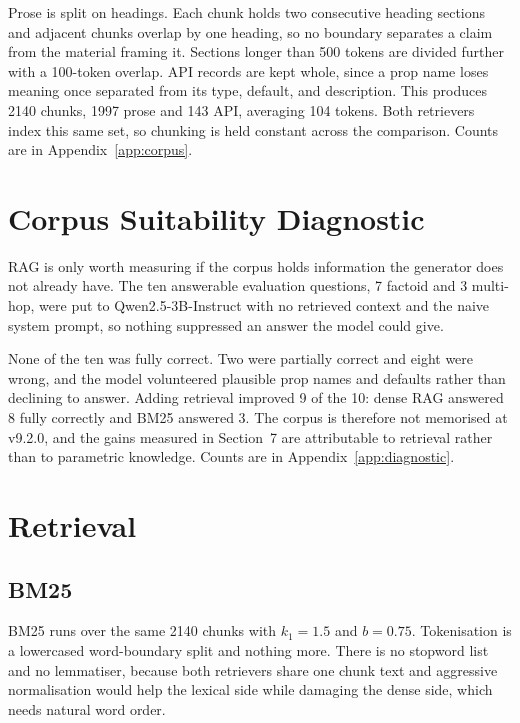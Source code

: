 \documentclass[10pt,a4paper]{article}
\begin{document}
Prose is split on headings. Each chunk holds two consecutive heading sections and adjacent chunks overlap by one heading, so no boundary separates a claim from the material framing it. Sections longer than 500 tokens are divided further with a 100-token overlap. API records are kept whole, since a prop name loses meaning once separated from its type, default, and description. This produces 2140 chunks, 1997 prose and 143 API, averaging 104 tokens. Both retrievers index this same set, so chunking is held constant across the comparison. Counts are in Appendix~\ref{app:corpus}.

\section{Corpus Suitability Diagnostic}

RAG is only worth measuring if the corpus holds information the generator does not already have. The ten answerable evaluation questions, 7 factoid and 3 multi-hop, were put to Qwen2.5-3B-Instruct with no retrieved context and the naive system prompt, so nothing suppressed an answer the model could give.

None of the ten was fully correct. Two were partially correct and eight were wrong, and the model volunteered plausible prop names and defaults rather than declining to answer. Adding retrieval improved 9 of the 10: dense RAG answered 8 fully correctly and BM25 answered 3. The corpus is therefore not memorised at v9.2.0, and the gains measured in Section~7 are attributable to retrieval rather than to parametric knowledge. Counts are in Appendix~\ref{app:diagnostic}.

\section{Retrieval}

\subsection{BM25}

BM25 runs over the same 2140 chunks with $k_1 = 1.5$ and $b = 0.75$. Tokenisation is a lowercased word-boundary split and nothing more. There is no stopword list and no lemmatiser, because both retrievers share one chunk text and aggressive normalisation would help the lexical side while damaging the dense side, which needs natural word order.
\end{document}
